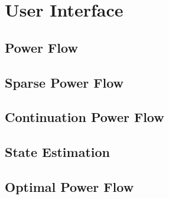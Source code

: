 \documentclass[varwidth]{standalone}
\providecommand{\powerflow}[1]{Power Flow}
\providecommand{\sparse}[1]{Sparse Power Flow}
\providecommand{\cpf}[1]{Continuation Power Flow}
\providecommand{\se}[1]{State Estimation}
\providecommand{\opf}[1]{Optimal Power Flow}
\begin{document}
\section{User Interface}

\subsection{\powerflow{}}

\subsection{\sparse{}}

\subsection{\cpf{}}

\subsection{\se{}}

\subsection{\opf{}}
\end{document}
